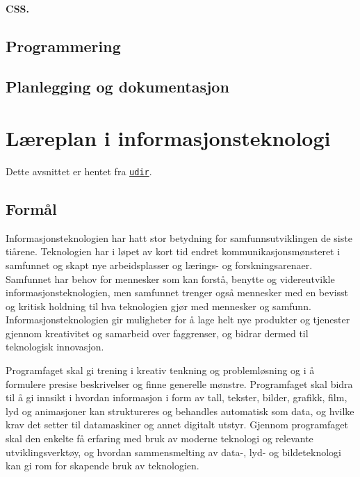 \documentclass[%
oneside,                 %
final,                   %
10pt]{article}
\begin{document}


\paragraph{CSS.}
\label{section:teori:css} 


\subsection{Programmering}
\label{section:teori:programmering}

\subsection{Planlegging og dokumentasjon}
\label{section:teori:planlegging}


\pagebreak

\section{Læreplan i informasjonsteknologi}

Dette avsnittet er hentet fra \href{{http://www.udir.no/kl06/inf1-01/Hele}}{\nolinkurl{udir}}.

\subsection{Formål}

Informasjonsteknologien har hatt stor betydning for
samfunnsutviklingen de siste tiårene. Teknologien har i løpet av kort
tid endret kommunikasjonsmønsteret i samfunnet og skapt nye
arbeidsplasser og lærings- og forskningsarenaer. Samfunnet har behov
for mennesker som kan forstå, benytte og videreutvikle
informasjonsteknologien, men samfunnet trenger også mennesker med en
bevisst og kritisk holdning til hva teknologien gjør med mennesker og
samfunn. Informasjonsteknologien gir muligheter for å lage helt nye
produkter og tjenester gjennom kreativitet og samarbeid over
faggrenser, og bidrar dermed til teknologisk innovasjon.

Programfaget skal gi trening i kreativ tenkning og problemløsning og
i å formulere presise beskrivelser og finne generelle
mønstre. Programfaget skal bidra til å gi innsikt i hvordan
informasjon i form av tall, tekster, bilder, grafikk, film, lyd og
animasjoner kan struktureres og behandles automatisk som data, og
hvilke krav det setter til datamaskiner og annet digitalt
utstyr. Gjennom programfaget skal den enkelte få erfaring med bruk av
moderne teknologi og relevante utviklingsverktøy, og hvordan
sammensmelting av data-, lyd- og bildeteknologi kan gi rom for
skapende bruk av teknologien.
\end{document}
